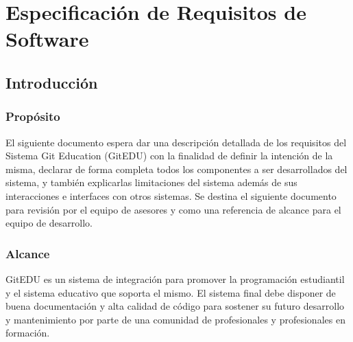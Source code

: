 

\chapter{Especificación de Requisitos de Software}
\label{ersDoc}

\section{Introducción}

\subsection{Propósito}
El siguiente documento espera dar una descripción detallada de los requisitos del Sistema Git Education (GitEDU) con la finalidad de definir la intención de la misma, declarar de forma completa todos los componentes a ser desarrollados del sistema, y también explicarlas limitaciones del sistema además de sus interacciones e interfaces con otros sistemas. Se destina el siguiente documento para revisión por el equipo de asesores y como una referencia de alcance para el equipo de desarrollo.

\subsection{Alcance}
GitEDU es un sistema de integración para promover la programación estudiantil y el sistema educativo que soporta el mismo. El sistema final debe disponer de buena documentación y alta calidad de código para sostener su futuro desarrollo y mantenimiento por parte de una comunidad de profesionales y profesionales en formación.

